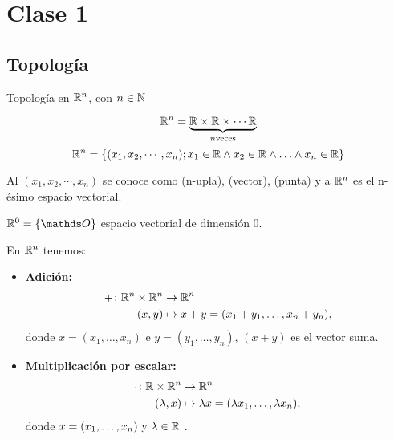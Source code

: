 \chapter{Clase 1}

\section{Topología}

Topología en $\mathbb{R}^{n}$, con $n \in \mathbb{N}$

$$
\mathbb{R}^{n} =  \underbrace{\mathbb{R} \times \mathbb{R} \times \cdots \mathbb{R} }_{n \text{veces}}
$$
$$
\mathbb{R}^{n} = \{ (x_1, x_2, \cdots, x_n); x_1 \in \mathbb{R} \wedge  x_2 \in \mathbb{R} \wedge
 \ldots  \wedge  x_n \in \mathbb{R}       \}
$$

Al $(x_1, x_2, \cdots, x_n) $  se conoce como (n-upla), (vector), (punta) y a $\mathbb{R}^{n}$ es el n-ésimo espacio vectorial.

$\Real{0} = \{\Ou\}$  espacio vectorial de dimensión $0$.

En $\mathbb{R}^{n}$ tenemos:

\begin{itemize}
    \item \textbf{Adición:}
    \begin{align*}
        +\colon \mathbb{R}^{n} \times \mathbb{R}^{n} &\to \mathbb{R}^{n} \\
        (x, y) &\mapsto x + y = (x_1 + y_1, \dots, x_n + y_n),
    \end{align*}
    donde $x = (x_1, \dots, x_n)$ e $y = (y_1, \dots, y_n)$, $(x+y)$ es el vector suma.

    \item \textbf{Multiplicación por escalar:}
    \begin{align*}
        \cdot\colon \mathbb{R} \times \mathbb{R}^{n} &\to \mathbb{R}^{n} \\
        (\lambda, x) &\mapsto \lambda x = (\lambda x_1, \dots, \lambda x_n),
    \end{align*}
    donde $x = (x_1, \dots, x_n) \text{ y } \lambda \in \mathbb{R}$ .
\end{itemize}




